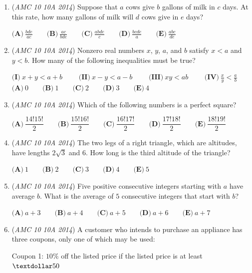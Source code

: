 \begin{enumerate}
 $\textbf{(A)}\ 1\qquad\textbf{(B)}\ 2\qquad\textbf{(C)}\ 3\qquad\textbf{(D)}\ 4\qquad\textbf{(E)}\ 5$


	\item (\textit{AMC 10 10A 2014}) Suppose that $a$ cows give $b$ gallons of milk in $c$ days. At this rate, how many gallons of milk will $d$ cows give in $e$ days?


 $\textbf{(A)}\ \frac{bde}{ac}\qquad\textbf{(B)}\ \frac{ac}{bde}\qquad\textbf{(C)}\ \frac{abde}{c}\qquad\textbf{(D)}\ \frac{bcde}{a}\qquad\textbf{(E)}\ \frac{abc}{de}$


	\item (\textit{AMC 10 10A 2014}) Nonzero real numbers $x$, $y$, $a$, and $b$ satisfy $x < a$ and $y < b$. How many of the following inequalities must be true?


 $\textbf{(I)}\ x+y < a+b\qquad$
$\textbf{(II)}\ x-y < a-b\qquad$
$\textbf{(III)}\ xy < ab\qquad$
$\textbf{(IV)}\ \frac{x}{y} < \frac{a}{b}$
$\textbf{(A)}\ 0\qquad\textbf{(B)}\ 1\qquad\textbf{(C)}\ 2\qquad\textbf{(D)}\ 3\qquad\textbf{(E)}\ 4$


	\item (\textit{AMC 10 10A 2014}) Which of the following numbers is a perfect square?


 $\textbf{(A)}\ \dfrac{14!15!}2\qquad\textbf{(B)}\ \dfrac{15!16!}2\qquad\textbf{(C)}\ \dfrac{16!17!}2\qquad\textbf{(D)}\ \dfrac{17!18!}2\qquad\textbf{(E)}\ \dfrac{18!19!}2$


	\item (\textit{AMC 10 10A 2014}) The two legs of a right triangle, which are altitudes, have lengths $2\sqrt3$ and $6$. How long is the third altitude of the triangle?


 $\textbf{(A)}\ 1\qquad\textbf{(B)}\ 2\qquad\textbf{(C)}\ 3\qquad\textbf{(D)}\ 4\qquad\textbf{(E)}\ 5$


	\item (\textit{AMC 10 10A 2014}) Five positive consecutive integers starting with $a$ have average $b$. What is the average of $5$ consecutive integers that start with $b$?


 $\textbf{(A)}\ a+3\qquad\textbf{(B)}\ a+4\qquad\textbf{(C)}\ a+5\qquad\textbf{(D)}\ a+6\qquad\textbf{(E)}\ a+7$


	\item (\textit{AMC 10 10A 2014}) A customer who intends to purchase an appliance has three coupons, only one of which may be used:


 Coupon 1: $10\%$ off the listed price if the listed price is at least $\textdollar50$



\end{enumerate}
